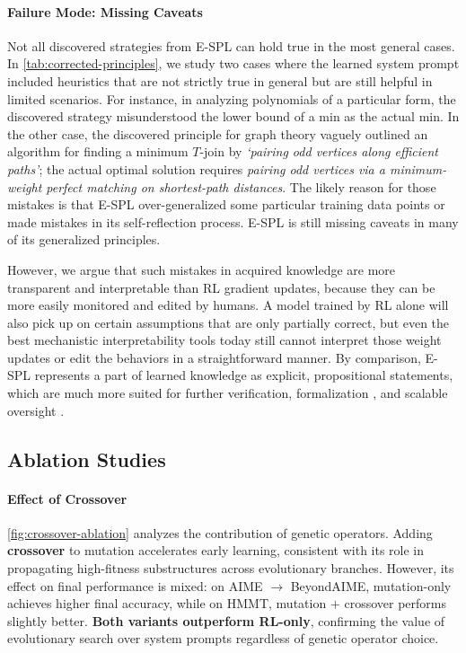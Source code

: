 \documentclass{article}
\theoremstyle{plain}
\theoremstyle{definition}
\theoremstyle{remark}
\begin{document}
\vspace{-6pt}
\paragraph{Failure Mode: Missing Caveats} Not all discovered strategies from E-SPL can hold true in the most general cases. In \autoref{tab:corrected-principles}, we study two cases where the learned system prompt included heuristics that are not strictly true in general but are still helpful in limited scenarios. For instance, in analyzing polynomials of a particular form, the discovered strategy misunderstood the lower bound of a min as the actual min. In the other case, the discovered principle for graph theory vaguely outlined an algorithm for finding a minimum $T$-join by \emph{`pairing odd vertices along efficient paths'}; the actual optimal solution requires \emph{pairing odd vertices via a minimum-weight perfect matching on shortest-path distances}. The likely reason for those mistakes is that E-SPL over-generalized some particular training data points or made mistakes in its self-reflection process. E-SPL is still missing caveats in many of its generalized principles. 

However, we argue that such mistakes in acquired knowledge are more transparent and interpretable than RL gradient updates, because they can be more easily monitored and edited by humans. A model trained by RL alone will also pick up on certain assumptions that are only partially correct, but even the best mechanistic interpretability tools today \cite{scaling-sae, transcoders, feature-circuit} still cannot interpret those weight updates or edit the behaviors in a straightforward manner. By comparison, E-SPL represents a part of learned knowledge as explicit, propositional statements, which are much more suited for further verification, formalization \cite{alphageometry, alphaproof}, and scalable oversight \cite{scalable-agent-alignment, scalable-oversight, llm-critic-help-catch-llm-bug}.

\vspace{-5pt}
\subsection{Ablation Studies}

\paragraph{Effect of Crossover} \autoref{fig:crossover-ablation} analyzes the contribution of genetic operators. Adding \textbf{crossover} to mutation accelerates early learning, consistent with its role in propagating high-fitness substructures across evolutionary branches. However, its effect on final performance is mixed: on AIME $\rightarrow$ BeyondAIME, mutation-only achieves higher final accuracy, while on HMMT, mutation $+$ crossover performs slightly better. \textbf{Both variants outperform RL-only}, confirming the value of evolutionary search over system prompts regardless of genetic operator choice.
\end{document}
